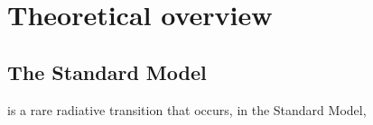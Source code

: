 \chapter{Theoretical overview}

\section{The Standard Model}

\BtoXsgamma is a rare radiative transition that occurs, in the Standard Model,